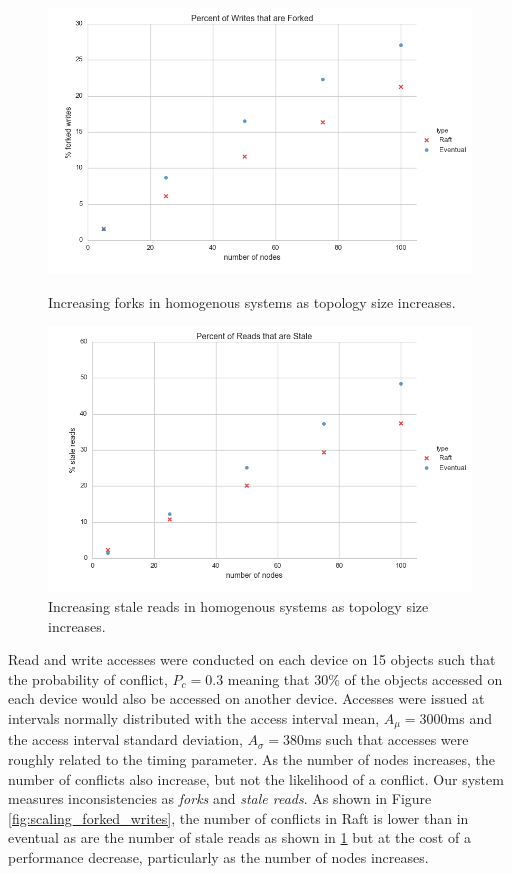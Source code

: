 \documentclass{article}
\begin{document}
\begin{figure}
    \centering
      \includegraphics[width=\linewidth]{figures/scaling/forked_writes}
      \caption{Increasing forks in homogenous systems as topology size increases.}
      \label{fig:scaling_forked_writes}
    \endminipage\hfill
      \includegraphics[width=\linewidth]{figures/scaling/stale_reads}
      \caption{Increasing stale reads in homogenous systems as topology size increases.}
      \label{fig:scaling_stale_reads}
    \endminipage
\end{figure}

Read and write accesses were conducted on each device on 15 objects such that the probability of conflict, $P_c=0.3$ meaning that 30\% of the objects accessed on each device would also be accessed on another device. Accesses were issued at intervals normally distributed with the access interval mean, $A_{\mu}=3000$ms and the access interval standard deviation, $A_{\sigma}=380$ms such that accesses were roughly related to the timing parameter. As the number of nodes increases, the number of conflicts also increase, but not the likelihood of a conflict. Our system measures inconsistencies as \textit{forks} and \textit{stale reads}. As shown in Figure \ref{fig:scaling_forked_writes}, the number of conflicts in Raft is lower than in eventual as are the number of stale reads as shown in \ref{fig:scaling_stale_reads} but at the cost of a performance decrease, particularly as the number of nodes increases.
\end{document}
